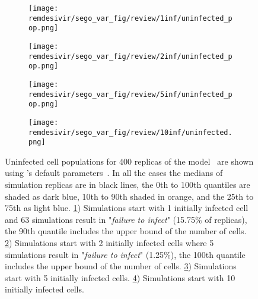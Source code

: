 \begin{figure}[H]
\centering
  \begin{subfigure}[b]{0.48\textwidth}
    \centering
    \texttt{[image: remdesivir/sego\_var\_fig/review/1inf/uninfected\_pop.png]} 
    \caption{} 
    \label{fig:remdes:res:var_sego:uninf_pop:1inf} 
  \end{subfigure} 
  \begin{subfigure}[b]{0.48\textwidth}
    \centering
    \texttt{[image: remdesivir/sego\_var\_fig/review/2inf/uninfected\_pop.png]} 
    \caption{} 
    \label{fig:remdes:res:var_sego:uninf_pop:2inf} 
  \end{subfigure} 


  \begin{subfigure}[b]{0.48\textwidth}
    \centering
    \texttt{[image: remdesivir/sego\_var\_fig/review/5inf/uninfected\_pop.png]} 
    \caption{} 
    \label{fig:remdes:res:var_sego:uninf_pop:5inf} 
  \end{subfigure} 
   \begin{subfigure}[b]{0.48\textwidth}
    \centering
    \texttt{[image: remdesivir/sego\_var\_fig/review/10inf/uninfected.png]} 
    \caption{} 
    \label{fig:remdes:res:var_sego:uninf_pop:10inf} 
  \end{subfigure} 
\caption{Uninfected cell populations for 400 replicas of the \sags model~\cite{sego_modular_2020} are shown using \sags's default parameters~\cite{sego_modular_2020}. In all the cases the medians of simulation replicas are in black lines, the 0th to 100th quantiles are shaded as dark blue, 10th to 90th shaded in orange, and the 25th to 75th as light blue. \ref{fig:remdes:res:var_sego:uninf_pop:1inf}) Simulations start with 1 initially infected cell and 63 simulations result in "\emph{failure to infect}" (15.75\% of replicas), the 90th quantile includes the upper bound of the number of cells. \ref{fig:remdes:res:var_sego:uninf_pop:2inf}) Simulations start with 2 initially infected cells where 5 simulations result in "\emph{failure to infect}" (1.25\%), the 100th quantile includes the upper bound of the number of cells. \ref{fig:remdes:res:var_sego:uninf_pop:5inf}) Simulations start with 5 initially infected cells. \ref{fig:remdes:res:var_sego:uninf_pop:10inf}) Simulations start with 10 initially infected cells.}\label{fig:remdes:res:var_sego:uninf_pop} 
\end{figure}



